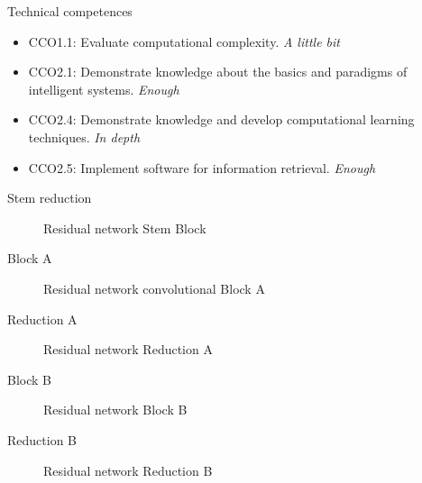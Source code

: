 
\begin{frame}{Technical competences}
  \begin{itemize}
    \item CCO1.1: Evaluate computational complexity. \emph{A little bit}
    \item CCO2.1: Demonstrate knowledge about the basics and paradigms of intelligent systems. 
    \emph{Enough}
    \item CCO2.4: Demonstrate knowledge and develop computational learning techniques. \emph{In depth}
    \item CCO2.5: Implement software for information retrieval. \emph{Enough}
  \end{itemize}
\end{frame}

\begin{frame}{Stem reduction}
  \begin{figure}
    \centering
    \scalebox{1.}{}
    \caption{Residual network Stem Block \label{fig:residual-block-stem}}
  \end{figure}
\end{frame}

\begin{frame}{Block A}
  \begin{figure}
    \centering
    \scalebox{.6}{}
    \caption{Residual network convolutional Block A \label{fig:residual-block-a}}
  \end{figure}
\end{frame}

\begin{frame}{Reduction A}
  \begin{figure}
    \centering
    \scalebox{.85}{}
    \caption{Residual network Reduction A \label{fig:residual-block-reduce-a}}
  \end{figure}
\end{frame}

\begin{frame}{Block B}
  \begin{figure}
    \centering
    \scalebox{.5}{}
    \caption{Residual network Block B \label{fig:residual-block-b}}
  \end{figure}
\end{frame}

\begin{frame}{Reduction B}
  \begin{figure}
    \centering
    \scalebox{.9}{}
    \caption{Residual network Reduction B \label{fig:residual-block-reduce-b}}
  \end{figure}
\end{frame}
